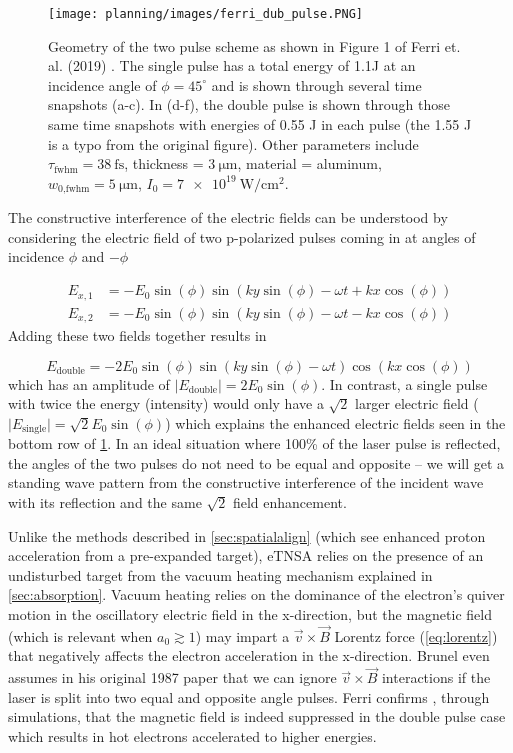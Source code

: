 \begin{figure}
	\centering 
	\texttt{[image: planning/images/ferri\_dub\_pulse.PNG]}
	\caption{Geometry of the two pulse scheme as shown in Figure 1 of Ferri et. al. (2019) \cite{Ferri_2019_Nat_Comm}. The single pulse has a total energy of 1.1J at an incidence angle of $\phi=45^\circ$ and is shown through several time snapshots (a-c). In (d-f), the double pulse is shown through those same time snapshots with energies of 0.55 J in each pulse (the 1.55 J is a typo from the original figure). Other parameters include $\tau_\text{fwhm} = \SI{38}{\femto \second}$, thickness = $\SI{3}{\micro \meter}$, material = aluminum, $w_\text{0,fwhm} = \SI{5}{\micro \meter}$, $I_0 = \SI{7e19}{\watt \per \centi \meter \squared}$.}
	\label{fig:ferri_dub_pulse}
\end{figure}
The constructive interference of the electric fields can be understood by considering the electric field of two p-polarized pulses coming in at angles of incidence $\phi$ and $-\phi$

\begin{align}
	E_{x,1} &= -E_0 \sin(\phi) \sin(k y \sin(\phi) - \omega t + k x \cos(\phi)) \\
	E_{x,2} &= -E_0 \sin(\phi) \sin(k y \sin(\phi) - \omega t - k x \cos(\phi))
\end{align}
Adding these two fields together results in 

\begin{equation}
	E_\text{double} = -2 E_0 \sin(\phi) \sin(k y \sin(\phi) - \omega t) \cos(k x \cos(\phi))
\end{equation}
which has an amplitude of $\lvert E_\text{double} \rvert = 2 E_0 \sin(\phi)$. In contrast, a single pulse with twice the energy (intensity) would only have a $\sqrt{2}$ larger electric field ($\lvert E_\text{single} \rvert = \sqrt{2} E_0 \sin(\phi)$) which explains the enhanced electric fields seen in the bottom row of \cref{fig:ferri_dub_pulse}. In an ideal situation where 100\% of the laser pulse is reflected, the angles of the two pulses do not need to be equal and opposite -- we will get a standing wave pattern from the constructive interference of the incident wave with its reflection and the same $\sqrt{2}$ field enhancement.  

Unlike the methods described in \cref{sec:spatialalign} (which see enhanced proton acceleration from a pre-expanded target), \gls{eTNSA} relies on the presence of an undisturbed target from the vacuum heating mechanism \cite{Brunel_1987_PRL} explained in \cref{sec:absorption}. Vacuum heating relies on the dominance of the electron's quiver motion in the oscillatory electric field in the x-direction, but the magnetic field (which is relevant when $a_0 \gtrsim 1$) may impart a $\vec{v} \times \vec{B}$ Lorentz force (\cref{eq:lorentz}) that negatively affects the electron acceleration in the x-direction. Brunel even assumes in his original 1987 paper \cite{Brunel_1987_PRL} that we can ignore $\vec{v} \times \vec{B}$ interactions if the laser is split into two equal and opposite angle pulses. Ferri confirms \cite{Ferri_2019_Nat_Comm}, through simulations, that the magnetic field is indeed suppressed in the double pulse case which results in hot electrons accelerated to higher energies. 

